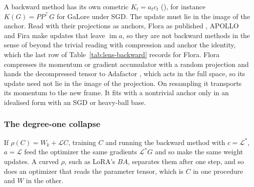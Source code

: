 A backward method has its own cometric $K_t=a_tc_t$ (), for instance $K(G)=PP^\top G$ for
GaLore under SGD. The update must lie in the image of the anchor. Read with their projections as anchors, Flora as
published \citep{hao2024flora}, APOLLO \citep{zhu2024apollo} and Fira \citep{chen2024fira} make updates that leave
$\operatorname{im}a$, so they are not backward methods in the sense of  beyond the trivial
reading with compression and anchor the identity, which the last row of Table~\ref{tab:lens-backward} records for
Flora. Flora compresses its momentum or gradient accumulator with a
random projection and hands the decompressed tensor to Adafactor \citep{shazeer2018adafactor}, which acts in the full
space, so its update need not lie in the image of the projection. On resampling it transports its momentum to the new
frame. It fits  with a nontrivial anchor only in an idealised form with an SGD or heavy-ball
base.

\subsubsection{The degree-one collapse}\label{sec:lens-collapse}

If $\rho(C)=W_k+\mathcal LC$, training $C$ and running the backward method with $c=\mathcal L^*$, $a=\mathcal L$ feed
the optimizer the same gradients $\mathcal L^*G$ and so make the same weight updates. A curved $\rho$, such as LoRA's
$BA$, separates them after one step, and so does an optimizer that reads the parameter tensor, which is $C$ in one
procedure and $W$ in the other.

